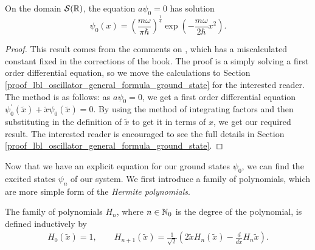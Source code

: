 \begin{theorem}\label{lbl_oscillator_general_formula_ground_state}
  On the domain $\mathcal{S}(\mathbb{R})$, the equation $a \psi_0 = 0$ has solution
  \begin{equation*}
    \psi_0 (x) = \left(\frac{m \omega}{\pi \hbar}\right)^{\frac{1}{4}} \exp\left( -\frac{m \omega}{2 \hbar}x^2 \right).
  \end{equation*}
\end{theorem}
\begin{proof}
  This result comes from the comments on {\cite[p.232]{Hall2013}}, which has a miscalculated constant fixed in the corrections of the book. The proof is a simply solving a first order differential equation, so we move the calculations to Section \eqref{proof_lbl_oscillator_general_formula_ground_state} for the interested reader. The method is as follows: as $a \psi_0 = 0$, we get a first order differential equation $\psi^\prime_0 (\tilde{x}) + \tilde{x}\psi_0(\tilde{x}) = 0$. By using the method of integrating factors and then substituting in the definition of $\tilde{x}$ to get it in terms of $x$, we get our required result. The interested reader is encouraged to see the full details in Section \eqref{proof_lbl_oscillator_general_formula_ground_state}.
\end{proof}


Now that we have an explicit equation for our ground states $\psi_0$, we can find the excited states $\psi_n$ of our system. We first introduce a family of polynomials, which are more simple form of the {\emph{Hermite polynomials}}.

\begin{definition}
  The family of polynomials $H_n$, where $n \in \mathbb{N}_0$ is the degree of the polynomial, is defined inductively by
  \begin{align*}
    H_0 (\tilde{x}) = 1, \qquad
    H_{n + 1} (\tilde{x}) = \frac{1}{\sqrt{2}} \left( 2\tilde{x}H_n(\tilde{x}) - \frac{d}{d\tilde{x}} H_n{\tilde{x}} \right).
  \end{align*}
\end{definition}

